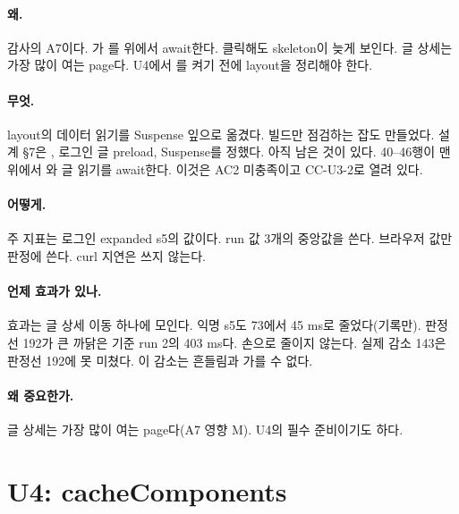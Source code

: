 \paragraph{왜.}
감사의 A7이다. 가 를  위에서 await한다.
클릭해도 skeleton이 늦게 보인다. 글 상세는 가장 많이 여는 page다.
U4에서 를 켜기 전에 layout을 정리해야 한다.

\paragraph{무엇.}
layout의 데이터 읽기를 Suspense 잎으로 옮겼다. 빌드만 점검하는 잡도 만들었다.
설계 \S7은 , 로그인 글 preload,  Suspense를 정했다.
아직 남은 것이 있다.  40--46행이 맨 위에서 와 글 읽기를 await한다.
이것은 AC2 미충족이고 CC-U3-2로 열려 있다.

\paragraph{어떻게.}
주 지표는 로그인 expanded s5의 \code{[nav]} 값이다. run 값 3개의 중앙값을 쓴다.
브라우저 \code{[nav]} 값만 판정에 쓴다. curl 지연은 쓰지 않는다.

\paragraph{언제 효과가 있나.}
효과는 글 상세 이동 하나에 모인다. 익명 s5도 73에서 45 ms로 줄었다(기록만).
판정선 192가 큰 까닭은 기준 run 2의 403 ms다. 손으로 줄이지 않는다.
실제 감소 143은 판정선 192에 못 미쳤다. 이 감소는 흔들림과 가를 수 없다.

\paragraph{왜 중요한가.}
글 상세는 가장 많이 여는 page다(A7 영향 M). U4의 필수 준비이기도 하다.

\section{U4: cacheComponents}\label{sec:re-u4}

